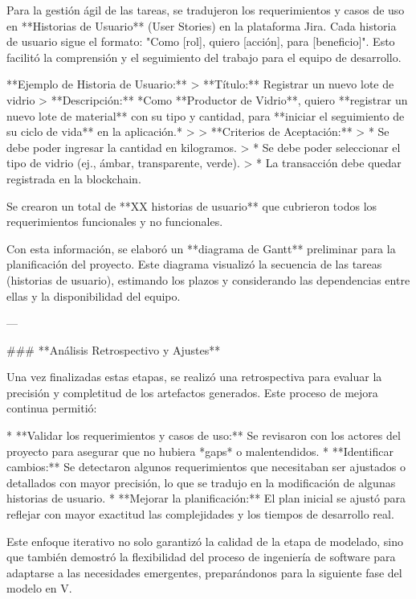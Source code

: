 Para la gestión ágil de las tareas, se tradujeron los requerimientos y casos de uso en **Historias de Usuario** (User Stories) en la plataforma Jira. Cada historia de usuario sigue el formato: "Como [rol], quiero [acción], para [beneficio]". Esto facilitó la comprensión y el seguimiento del trabajo para el equipo de desarrollo.

**Ejemplo de Historia de Usuario:**
> **Título:** Registrar un nuevo lote de vidrio
> **Descripción:** *Como **Productor de Vidrio**, quiero **registrar un nuevo lote de material** con su tipo y cantidad, para **iniciar el seguimiento de su ciclo de vida** en la aplicación.*
>
> **Criterios de Aceptación:**
> * Se debe poder ingresar la cantidad en kilogramos.
> * Se debe poder seleccionar el tipo de vidrio (ej., ámbar, transparente, verde).
> * La transacción debe quedar registrada en la blockchain.

Se crearon un total de **XX historias de usuario** que cubrieron todos los requerimientos funcionales y no funcionales.

Con esta información, se elaboró un **diagrama de Gantt** preliminar para la planificación del proyecto. Este diagrama visualizó la secuencia de las tareas (historias de usuario), estimando los plazos y considerando las dependencias entre ellas y la disponibilidad del equipo.

---

### **Análisis Retrospectivo y Ajustes**

Una vez finalizadas estas etapas, se realizó una retrospectiva para evaluar la precisión y completitud de los artefactos generados. Este proceso de mejora continua permitió:

* **Validar los requerimientos y casos de uso:** Se revisaron con los actores del proyecto para asegurar que no hubiera *gaps* o malentendidos.
* **Identificar cambios:** Se detectaron algunos requerimientos que necesitaban ser ajustados o detallados con mayor precisión, lo que se tradujo en la modificación de algunas historias de usuario.
* **Mejorar la planificación:** El plan inicial se ajustó para reflejar con mayor exactitud las complejidades y los tiempos de desarrollo real.

Este enfoque iterativo no solo garantizó la calidad de la etapa de modelado, sino que también demostró la flexibilidad del proceso de ingeniería de software para adaptarse a las necesidades emergentes, preparándonos para la siguiente fase del modelo en V.
